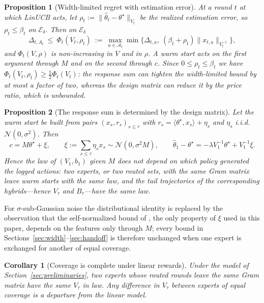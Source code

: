 \documentclass{article}
\newtheorem{proposition}{Proposition}
\newtheorem{corollary}{Corollary}
\theoremstyle{definition}
\theoremstyle{remark}
\theoremstyle{remark}
\begin{document}
\begin{proposition}[Width-limited regret with estimation error]
\label{prop:two-channel}
At a round $t$ at which LinUCB acts, let
$\rho_t:=\|\widehat\theta_t-\theta^\star\|_{V_t}$ be the realized estimation
error, so $\rho_t\le\beta_t$ on $\mathcal E_\delta$. Then on $\mathcal E_\delta$
\begin{equation}
\label{eq:phi-two}
\Delta_{t,A_t}\ \le\ \Phi_t(V_t,\rho_t)\ :=\
\max_{a\in\mathcal A_t}\min\bigl\{\Delta_{t,a},\ (\beta_t+\rho_t)\|x_{t,a}\|_{V_t^{-1}}\bigr\},
\end{equation}
and $\Phi_t(V,\rho)$ is non-increasing in $V$ and in $\rho$. A warm start acts
on the first argument through $M$ and on the second through $c$. Since
$0\le\rho_t\le\beta_t$ we have $\Phi_t(V_t,\rho_t)\ge\tfrac12\Phi_t(V_t)$: the
response sum can tighten the width-limited bound by at most a factor of two,
whereas the design matrix can reduce it by the price ratio, which is unbounded.
\end{proposition}

\begin{proposition}[The response sum is determined by the design matrix]
\label{prop:response-sum}
Let the warm start be built from pairs $(x_s,r_s)_{s\le\tau}$ with
$r_s=\langle\theta^\star,x_s\rangle+\eta_s$ and $\eta_s$ i.i.d.\
$\mathcal N(0,\sigma^2)$. Then
\[
c=M\theta^\star+\xi,\qquad \xi:=\sum_{s\le\tau}\eta_sx_s\sim\mathcal N(0,\sigma^2M),
\qquad
\widehat\theta_1-\theta^\star=-\lambda V_1^{-1}\theta^\star+V_1^{-1}\xi .
\]
Hence the law of $(V_1,b_1)$ given $M$ does not depend on which policy
generated the logged actions: two experts, or two routed sets, with the same
Gram matrix leave warm starts with the same law, and the tail trajectories of
the corresponding hybrids---hence $V_\tau$ and $B_\tau$---have the same law.
\end{proposition}

For $\sigma$-sub-Gaussian noise the distributional identity is replaced by the
observation that the self-normalized bound of \cite{abbasi2011improved}, the
only property of $\xi$ used in this paper, depends on the features only
through $M$; every bound in Sections~\ref{sec:width}--\ref{sec:handoff} is
therefore unchanged when one expert is exchanged for another of equal coverage.

\begin{corollary}[Coverage is complete under linear rewards]
\label{cor:coverage-complete}
Under the model of Section~\ref{sec:preliminaries}, two experts whose routed
rounds leave the same Gram matrix have the same $V_\tau$ in law. Any
difference in $V_\tau$ between experts of equal coverage is a departure from
the linear model.
\end{corollary}
\end{document}
